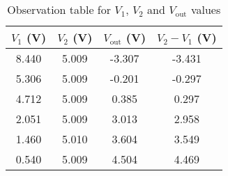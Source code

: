 \begin{table}[H]
    \centering
    \begin{tabular}{|c|c|c|c|} \hline
        $V_1$ (V)& $V_2$ (V) & $V_\text{out}$ (V) & $V_2-V_1$ (V) \\ \hline
        8.440 & 5.009 & -3.307 & -3.431 \\
        5.306 & 5.009 & -0.201 & -0.297 \\
        4.712 & 5.009 & 0.385 & 0.297 \\
        2.051 & 5.009 & 3.013 & 2.958 \\
        1.460 & 5.010 & 3.604 & 3.549 \\
        0.540& 5.009 & 4.504 & 4.469 \\
        \hline
        \end{tabular}    
        \caption{Observation table for $V_1$, $V_2$ and $V_\text{out}$ values}
        \label{tab:3}
\end{table}